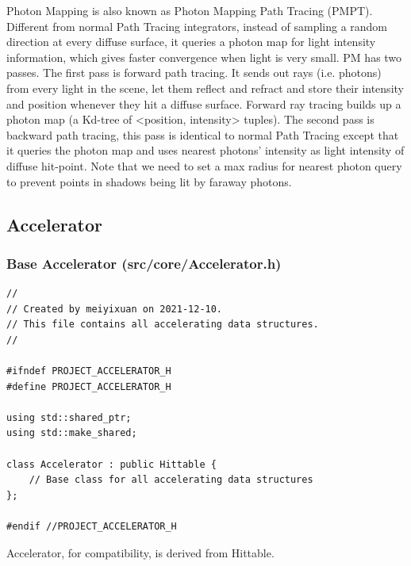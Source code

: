 \documentclass[utf8]{article}
\begin{document}
Photon Mapping is also known as Photon Mapping Path Tracing (PMPT). Different from normal Path Tracing integrators, instead of sampling a random direction at every diffuse surface, it queries a photon map for light intensity information, which gives faster convergence when light is very small. PM has two passes. The first pass is forward path tracing. It sends out rays (i.e. photons) from every light in the scene, let them reflect and refract and store their intensity and position whenever they hit a diffuse surface. Forward ray tracing builds up a photon map (a Kd-tree of <position, intensity> tuples). The second pass is backward path tracing, this pass is identical to normal Path Tracing except that it queries the photon map and uses nearest photons' intensity as light intensity of diffuse hit-point. Note that we need to set a max radius for nearest photon query to prevent points in shadows being lit by faraway photons.

\subsection{Accelerator}
\subsubsection{Base Accelerator (src/core/Accelerator.h)}
\begin{lstlisting}[style=CStyle]
//
// Created by meiyixuan on 2021-12-10.
// This file contains all accelerating data structures.
//

#ifndef PROJECT_ACCELERATOR_H
#define PROJECT_ACCELERATOR_H

using std::shared_ptr;
using std::make_shared;

class Accelerator : public Hittable {
	// Base class for all accelerating data structures
};

#endif //PROJECT_ACCELERATOR_H

\end{lstlisting}
Accelerator, for compatibility, is derived from Hittable.
\end{document}

